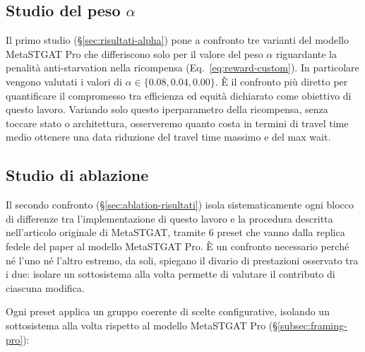 \subsection{Studio del peso \texorpdfstring{$\alpha$}{alpha}}

Il primo studio (§\ref{sec:risultati-alpha}) pone a confronto tre varianti del
modello MetaSTGAT Pro che differiscono solo per il valore del peso $\alpha$ riguardante la penalità anti-starvation
nella ricompensa (Eq.~\ref{eq:reward-custom}).
In particolare vengono valutati i valori di $\alpha \in \{0.08, 0.04, 0.00\}$.
È il confronto più diretto per quantificare il compromesso tra efficienza ed
equità dichiarato come obiettivo di questo lavoro.
Variando solo questo iperparametro della ricompensa, senza toccare stato o architettura,
osserveremo quanto costa in termini di travel time medio ottenere una data riduzione del travel time massimo e del max wait.

\subsection{Studio di ablazione}

Il secondo confronto (§\ref{sec:ablation-risultati}) isola sistematicamente ogni blocco di differenze
tra l'implementazione di questo lavoro e la procedura
descritta nell'articolo originale di MetaSTGAT, tramite 6 preset che
vanno dalla replica fedele del paper al modello MetaSTGAT Pro.
È un confronto necessario perché né l'uno né l'altro estremo, da soli,
spiegano il divario di prestazioni osservato tra i due: isolare un
sottosistema alla volta permette di valutare il contributo di ciascuna modifica.

Ogni preset applica un gruppo coerente di scelte configurative,
isolando un sottosistema alla volta rispetto al modello MetaSTGAT Pro (§\ref{subsec:framing-pro}):

